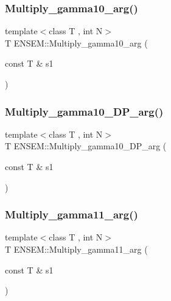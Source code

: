 \mbox{\label{namespaceENSEM_a42393303080da191decc1e01988b62db}} 
\subsubsection{\texorpdfstring{Multiply\_gamma10\_arg()}{Multiply\_gamma10\_arg()}}
{\footnotesize\ttfamily template$<$class T , int N$>$ \\
T E\+N\+S\+E\+M\+::\+Multiply\+\_\+gamma10\+\_\+arg (\begin{DoxyParamCaption}\item[{const T \&}]{s1 }\end{DoxyParamCaption})\hspace{0.3cm}{\ttfamily [inline]}}

\mbox{\label{namespaceENSEM_ad9734f79b04e6191b2edc36dd14e6da7}} 
\subsubsection{\texorpdfstring{Multiply\_gamma10\_DP\_arg()}{Multiply\_gamma10\_DP\_arg()}}
{\footnotesize\ttfamily template$<$class T , int N$>$ \\
T E\+N\+S\+E\+M\+::\+Multiply\+\_\+gamma10\+\_\+\+D\+P\+\_\+arg (\begin{DoxyParamCaption}\item[{const T \&}]{s1 }\end{DoxyParamCaption})\hspace{0.3cm}{\ttfamily [inline]}}

\mbox{\label{namespaceENSEM_af5e60b5893c30408a3b7d3da5b7c5f6e}} 
\subsubsection{\texorpdfstring{Multiply\_gamma11\_arg()}{Multiply\_gamma11\_arg()}}
{\footnotesize\ttfamily template$<$class T , int N$>$ \\
T E\+N\+S\+E\+M\+::\+Multiply\+\_\+gamma11\+\_\+arg (\begin{DoxyParamCaption}\item[{const T \&}]{s1 }\end{DoxyParamCaption})\hspace{0.3cm}{\ttfamily [inline]}}

